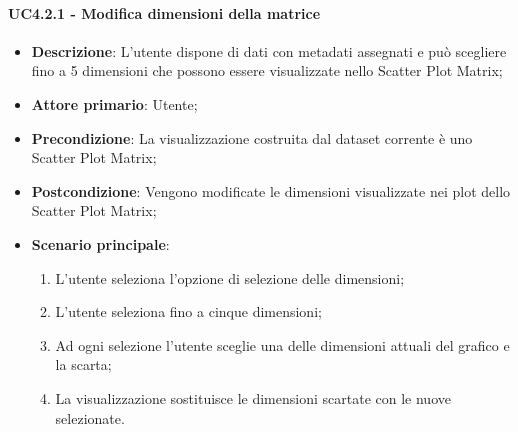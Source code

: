 \paragraph{UC4.2.1 - Modifica dimensioni della matrice}
\label{par:uc4.2.1}
\begin{itemize}
    \item \textbf{Descrizione}:     L’utente dispone di dati con metadati assegnati e può
                                    scegliere fino a 5 dimensioni che possono essere visualizzate nello Scatter Plot
                                    Matrix;

    \item \textbf{Attore primario}: Utente;

    \item \textbf{Precondizione}:   La visualizzazione costruita dal dataset corrente è uno Scatter Plot Matrix;
    \item \textbf{Postcondizione}:  Vengono modificate le dimensioni visualizzate nei plot dello Scatter Plot Matrix;

	\item \textbf{Scenario principale}:
        \begin{enumerate}
            \item   L'utente seleziona l'opzione di selezione delle dimensioni;
            \item   L'utente seleziona fino a cinque dimensioni;

            \item   Ad ogni selezione l'utente
                    sceglie una delle dimensioni attuali del grafico e la scarta;

            \item   La visualizzazione sostituisce le dimensioni scartate con le nuove selezionate.
        \end{enumerate}
\end{itemize}

